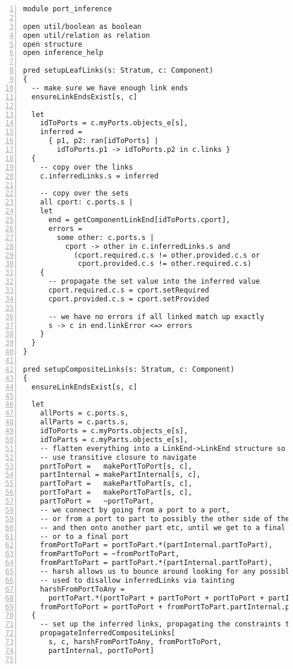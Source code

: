 \lstset{frame=tb, aboveskip=12pt, belowskip=-3pt, breaklines=true, basicstyle=\tiny\ttfamily, tabsize=2, mathescape=true}
\begin{lstlisting}[caption={port\_inference.als}, numbers=left]
module port_inference

open util/boolean as boolean
open util/relation as relation
open structure
open inference_help

pred setupLeafLinks(s: Stratum, c: Component)
{
  -- make sure we have enough link ends
  ensureLinkEndsExist[s, c]

  let
    idToPorts = c.myPorts.objects_e[s],
    inferred =
      { p1, p2: ran[idToPorts] |
        idToPorts.p1 -> idToPorts.p2 in c.links }
  {
    -- copy over the links
    c.inferredLinks.s = inferred

    -- copy over the sets
    all cport: c.ports.s |
    let
      end = getComponentLinkEnd[idToPorts.cport],
      errors =
        some other: c.ports.s |
          cport -> other in c.inferredLinks.s and
            (cport.required.c.s != other.provided.c.s or
             cport.provided.c.s != other.required.c.s)
    {
      -- propagate the set value into the inferred value
      cport.required.c.s = cport.setRequired
      cport.provided.c.s = cport.setProvided
  
      -- we have no errors if all linked match up exactly
      s -> c in end.linkError <=> errors
    }
  }
}

pred setupCompositeLinks(s: Stratum, c: Component)
{
  ensureLinkEndsExist[s, c]

  let
    allPorts = c.ports.s,
    allParts = c.parts.s,
    idToPorts = c.myPorts.objects_e[s],
    idToParts = c.myParts.objects_e[s],
    -- flatten everything into a LinkEnd->LinkEnd structure so we can
    -- use transitive closure to navigate
    portToPort =   makePortToPort[s, c],
    partInternal = makePartInternal[s, c],
    partToPart =   makePartToPart[s, c],
    portToPart =   makePortToPart[s, c],
    partToPort =   ~portToPart,
    -- we connect by going from a port to a port,
    -- or from a port to part to possibly the other side of the part
    -- and then onto another part etc, until we get to a final part,
    -- or to a final port
    fromPortToPart = portToPart.*(partInternal.partToPart),
    fromPartToPort = ~fromPortToPart,
    fromPartToPart = partToPart.*(partInternal.partToPart),
    -- harsh allows us to bounce around looking for any possibly connected other elements.
    -- used to disallow inferredLinks via tainting
    harshFromPortToAny =
      portToPart.*(portToPart + partToPort + portToPort + partInternal + partToPart),
    fromPortToPort = portToPort + fromPortToPart.partInternal.partToPort
  {
    -- set up the inferred links, propagating the constraints to the next level
    propagateInferredCompositeLinks[
      s, c, harshFromPortToAny, fromPortToPort,
      partInternal, portToPort]


\end{lstlisting}

